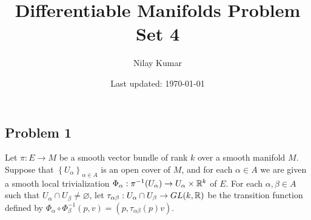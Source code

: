 \documentclass{../../mathnotes}
\title{Differentiable Manifolds Problem Set 4}
\author{Nilay Kumar}
\date{Last updated: \today}
\begin{document}
\maketitle

\subsection*{Problem 1}

Let $\pi: E\to M$ be a smooth vector bundle of rank $k$ over a smooth manifold $M$. Suppose that $\left\{ U_\alpha \right\}_{\alpha\in A}$
is an open cover of $M$, and for each $\alpha\in A$ we are given a smooth local trivialization $\Phi_\alpha:\pi^{-1}(U_\alpha)\to U_\alpha\times\mathbb{R}^k$
of $E$. For each $\alpha,\beta\in A$ such that $U_\alpha\cap U_\beta\neq\varnothing$, let $\tau_{\alpha\beta}:U_\alpha\cap U_\beta\to GL(k,\mathbb{R})$ be
the transition function defined by $\Phi_\alpha\circ\Phi_\beta^{-1}(p,v)=(p,\tau_{\alpha\beta}(p)v)$.
\end{document}

